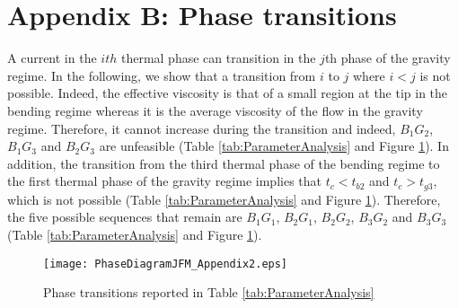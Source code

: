 \section*{Appendix B: Phase transitions}\label{PhaseDi}

A current in the $ith$ thermal phase can transition in the $j$th phase
of the  gravity regime. In  the following,  we show that  a transition
from $i$  to $j$ where  $i<j$ is  not possible. Indeed,  the effective
viscosity is that of  a small region at the tip  in the bending regime
whereas it is the average viscosity of the flow in the gravity regime.
Therefore,  it  cannot  increase  during the  transition  and  indeed,
$B_1G_2$,    $B_1G_3$    and    $B_2G_3$   are    unfeasible    (Table
\ref{tab:ParameterAnalysis}  and   Figure  \ref{PD_ALLpossible}).   In
addition, the transition  from the third thermal phase  of the bending
regime to the  first thermal phase of the gravity  regime implies that
$t_c<t_{b2}$   and  $t_c>t_{g3}$,   which  is   not  possible   (Table
\ref{tab:ParameterAnalysis}    and    Figure    \ref{PD_ALLpossible}).
Therefore,  the  five possible  sequences  that  remain are  $B_1G_1$,
$B_2G_1$,     $B_2G_2$,      $B_3G_2$     and      $B_3G_3$     (Table
\ref{tab:ParameterAnalysis} and Figure \ref{PD_ALLpossible}).

\begin{figure}
  \begin{center}
    \graphicspath{ {/Users/thorey/Documents/These/Projet/Refroidissement/Skin_Model/Figure/JFM_V13/} }
    \texttt{[image: PhaseDiagramJFM\_Appendix2.eps]}
    \caption{Phase       transitions      reported       in      Table
      \ref{tab:ParameterAnalysis}}
    \label{PD_ALLpossible}
  \end{center}
\end{figure}


